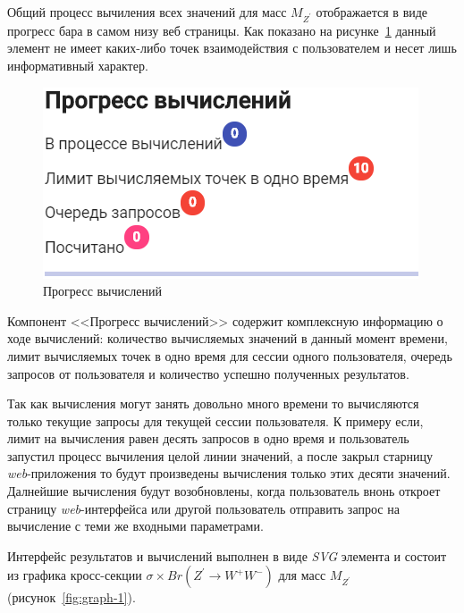 Общий процесс вычиления всех значений для масс ${M}_{{Z}^{\prime}}$ отображается в виде прогресс бара в самом низу веб страницы. Как показано на рисунке~\ref{fig:progress} данный элемент не имеет каких-либо точек взаимодействия с пользователем и несет лишь информативный характер.

\begin{figure}[!h]
	\centering
	\includegraphics[width=\textwidth]{figures/progress.png}
	\caption{Прогресс вычислений}
	\label{fig:progress}
\end{figure}

Компонент <<Прогресс вычислений>> содержит комплексную информацию о ходе вычислений: количество вычисляемых значений в данный момент времени, лимит вычисляемых точек в одно время для сессии одного пользователя, очередь запросов от пользователя и количество успешно полученных результатов.

Так как вычисления могут занять довольно много времени то вычисляются только текущие запросы для текущей сессии пользователя. К примеру если, лимит на вычисления равен десять запросов в одно время и пользователь запустил процесс вычиления целой линии значений, а после закрыл старницу \textit{web}-приложения то будут произведены вычисления только этих десяти значений. Далнейшие вычисления будут возобновлены, когда пользователь внонь откроет страницу \textit{web}-интерфейса или другой пользователь отправить запрос на вычисление с теми же входными параметрами.

Интерфейс результатов и вычислений выполнен в виде \textit{SVG} элемента и состоит из графика кросс-секции $\sigma \times Br({Z}^{\prime} \rightarrow {W}^{+}{W}^{-})$ для масс ${M}_{{Z}^{\prime}}$ (рисунок~\ref{fig:graph-1}).

